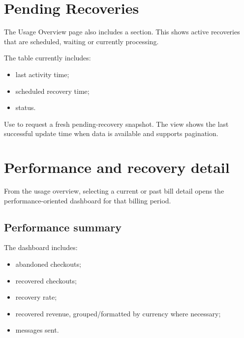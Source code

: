 \chapter{Pending Recoveries}

The Usage Overview page also includes a  section. This shows active recoveries that are scheduled, waiting or currently processing.

The table currently includes:
\begin{itemize}
  \item last activity time;
  \item scheduled recovery time;
  \item status.
\end{itemize}

Use  to request a fresh pending-recovery snapshot. The view shows the last successful update time when data is available and supports pagination.



\chapter{Performance and recovery detail}

From the usage overview, selecting a current or past bill detail opens the performance-oriented dashboard for that billing period.

\section{Performance summary}
The dashboard includes:
\begin{itemize}
  \item abandoned checkouts;
  \item recovered checkouts;
  \item recovery rate;
  \item recovered revenue, grouped/formatted by currency where necessary;
  \item messages sent.
\end{itemize}


